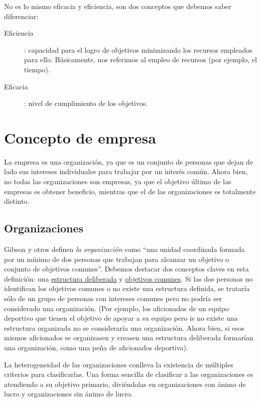 \documentclass[12pt,a4paper,spanish]{report}
\begin{document}
		No es lo mismo eficacia y eficiencia, son dos conceptos que debemos saber diferenciar:

		\flushleft
		\begin{description}
			\item[Eficiencia]: capacidad para el logro de objetivos minimizando los recursos empleados para ello. Básicamente, nos referimos al empleo de recursos (por ejemplo, el tiempo).

			\item[Eficacia]: nivel de cumplimiento de los objetivos.
		\end{description}

	\section{\textcolor[rgb]{0.5,0.8,0.9}Concepto de empresa}

		La empresa es una organización, ya que es un conjunto de personas que dejan de lado sus intereses individuales para trabajar por un interés común. Ahora bien, no todas las organizaciones son empresas, ya que el objetivo último de las empresas es obtener beneficio, mientras que el de las organizaciones es totalmente distinto.

		\subsection{\textcolor[rgb]{0.5,0.8,0.9}Organizaciones}
			Gibson y otros definen \textcolor[rgb]{0.5,0.8,0.9}{\emph{la organización}} como ``una unidad coordinada formada por un mínimo de dos personas que trabajan para alcanzar un objetivo o conjunto de objetivos comunes''. Debemos destacar dos conceptos claves en esta definición: una \underline{estructura deliberada} y \underline{objetivos comunes}. Si las dos personas no identifican los objetivos comunes o no existe una estructura definida, se trataría sólo de un grupo de personas con intereses comunes pero no podría ser considerado una organización. (Por ejemplo, los aficionados de un equipo deportivo que tienen el objetivo de apoyar a su equipo pero is no existe una estructura organizada no se consideraría una organización. Ahora bien, si esos mismos aficionados se organizasen y creasen una estructura deliberada formarían una organización, como una peña de aficionados deportiva).

			La heterogeneidad de las organizaciones conlleva la existencia de múltiples criterios para clasificarlas. Una forma sencilla de clasificar a las organizaciones es atendiendo a su objetivo primario, diviéndolas en organizaciones con ánimo de lucro y organizaciones sin ánimo de lucro.
\end{document}

